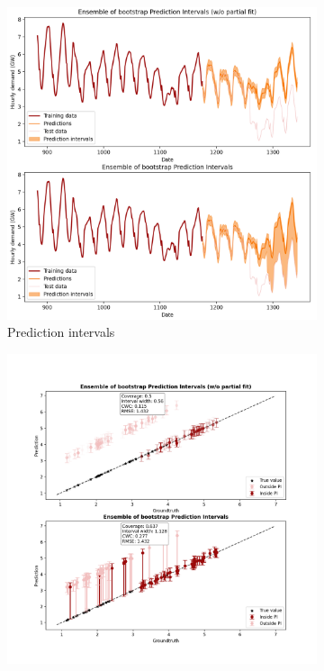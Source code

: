 \begin{figure}[ht]
    \centering
    \begin{subfigure}[b]{\textwidth}
        \centering
        \includegraphics[width=.8\textwidth]{Figures/timeseries/with-change-point/prediction-intervals-timeseries-problem-with-change-point.png}
        \caption{Prediction intervals}
        \label{subfig:app-timeseries-prediction-intervals-cpoint}
    \end{subfigure}
    \hfill %
    \begin{subfigure}[b]{\textwidth} %
        \centering
        \includegraphics[width=.8\textwidth]{Figures/timeseries/with-change-point/average-goodness-timeseries-problem-with-change-point.png} %

\end{subfigure}
\end{figure}
